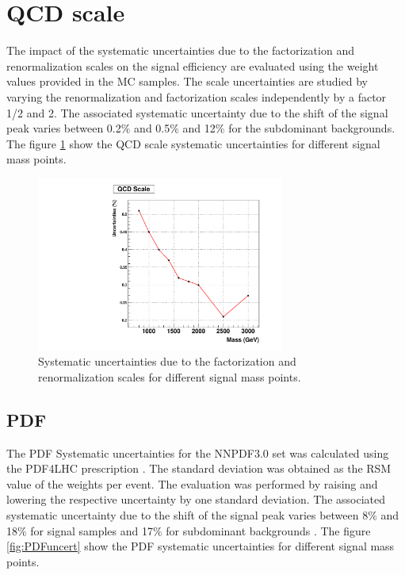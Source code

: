 \section{QCD scale}
The impact of the systematic uncertainties due to the factorization and renormalization scales on the signal efficiency are evaluated using the weight values provided in the MC samples. The scale uncertainties are studied by varying the renormalization and factorization scales independently by a factor 1/2 and 2. The associated systematic uncertainty due to the shift of the signal peak varies between 0.2$\%$ and 0.5$\%$ and 12$\%$ for the subdominant backgrounds. The figure \ref{fig:QCDuncert} show the QCD scale systematic uncertainties for different signal mass points.

\begin{figure}[!ht]
\caption{ Systematic uncertainties due to the factorization and renormalization scales for different signal mass points.}
\begin{center}
  \includegraphics[width=230pt]{figures/SystUncert/UncertQCD.pdf}
\end{center}
\label{fig:QCDuncert}
\end{figure}

\subsection{PDF}

The PDF Systematic uncertainties for the NNPDF3.0 set was calculated using the PDF4LHC prescription \cite{Butterworth:2015oua}. The standard deviation was obtained as the RSM value of the weights per event. The evaluation was performed by raising and lowering the respective uncertainty by one standard deviation. The associated systematic uncertainty due to the shift of the signal peak varies between 8$\%$ and 18$\%$ for signal samples and 17$\%$ for subdominant backgrounds . The figure \ref{fig:PDFuncert} show the PDF systematic uncertainties for different signal mass points.

